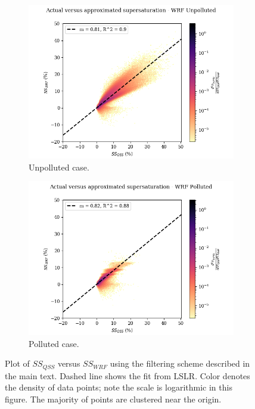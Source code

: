 \documentclass{article}
\begin{document}
\begin{figure}[ht]
	\centering
	\begin{subfigure}{0.7\textwidth}
		\includegraphics[width=\textwidth]{wrf/heatmap_ss_qss_vs_ss_wrf_Unpolluted_figure.png}
		\caption{Unpolluted case.}
		\label{wrfvsqssunpoll}
	\end{subfigure}
	\begin{subfigure}{0.7\textwidth}
		\includegraphics[width=\textwidth]{wrf/heatmap_ss_qss_vs_ss_wrf_Polluted_figure.png}
		\caption{Polluted case.}
		\label{wrfvsqsspoll}
	\end{subfigure}
	\caption{Plot of $SS_{QSS}$ versus $SS_{WRF}$ using the filtering scheme described in the main text. Dashed line shows the fit from LSLR. Color denotes the density of data points; note the scale is logarithmic in this figure. The majority of points are clustered near the origin.}
	\label{wrfvsqss}
\end{figure}
\end{document}
